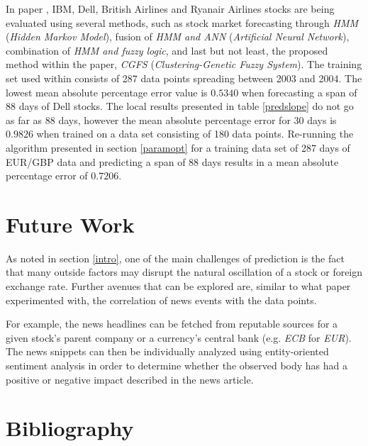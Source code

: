 \documentclass[a4paper,12pt]{article}
\begin{document}
	In paper \cite{hadavandi2010integration}, IBM, Dell, British Airlines and Ryanair Airlines stocks are being evaluated using several methods, such as stock market forecasting through \textit{HMM}\cite{hassan2005stock} (\textit{Hidden Markov Model}), fusion of \textit{HMM and ANN}\cite{hassan2007fusion} (\textit{Artificial Neural Network}), combination of \textit{HMM and fuzzy logic}\cite{hassan2009combination}, and last but not least, the proposed method within the paper, \textit{CGFS} (\textit{Clustering-Genetic Fuzzy System}). The training set used within consists of 287 data points spreading between 2003 and 2004. The lowest mean absolute percentage error value is $0.5340$ when forecasting a span of 88 days of Dell stocks. The local results presented in table \ref{predslope} do not go as far as 88 days, however the mean absolute percentage error for 30 days is $0.9826$ when trained on a data set consisting of 180 data points. Re-running the algorithm presented in section \ref{paramopt} for a training data set of 287 days of EUR/GBP data and predicting a span of 88 days results in a mean absolute percentage error of $0.7206$.

\section{Future Work}

	As noted in section \ref{intro}, one of the main challenges of prediction is the fact that many outside factors may disrupt the natural oscillation of a stock or foreign exchange rate. Further avenues that can be explored are, similar to what paper \cite{zhai2007combining} experimented with, the correlation of news events with the data points.
	
	For example, the news headlines can be fetched from reputable sources for a given stock's parent company or a currency's central bank (e.g. \textit{ECB} for \textit{EUR}). The news snippets can then be individually analyzed using entity-oriented sentiment analysis in order to determine whether the observed body has had a positive or negative impact described in the news article.

\newpage
\section{Bibliography}

	\begingroup
	\renewcommand{\section}[2]{}
		
		
	\endgroup
\end{document}
